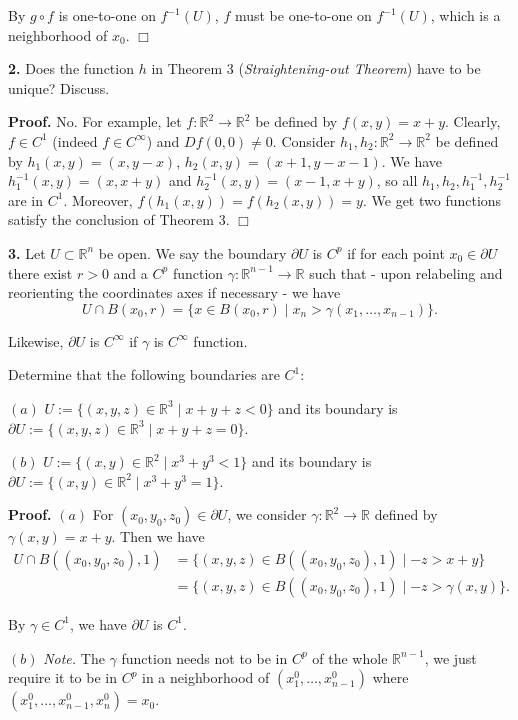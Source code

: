\documentclass{article}
\begin{document}
By $g\circ f$ is one-to-one on $f^{-1}(U)$, $f$ must be one-to-one on
$f^{-1}(U)$, which is a neighborhood of $x_0$. $\Box$

    \textbf{2.} Does the function $h$ in Theorem 3 (\emph{Straightening-out
Theorem}) have to be unique? Discuss.

    \textbf{Proof.} No. For example, let $f:\mathbb{R}^2 \to \mathbb{R}^2$
be defined by $f(x,y) = x+y$. Clearly, $f \in C^1$ (indeed
$f\in C^{\infty}$) and $Df(0,0) \ne 0$. Consider
$h_1,h_2 :\mathbb{R}^2 \to \mathbb{R}^2$ be defined by
$h_1(x,y) = (x,y -x)$, $h_2(x,y) = (x+1,y-x-1)$. We have
$h_1^{-1}(x,y) = (x,x+y)$ and $h_2^{-1}(x,y) = (x-1, x + y )$, so all
$h_1, h_2, h_1^{-1}, h_2^{-1}$ are in $C^{1}$. Moreover,
$f(h_1(x,y)) = f(h_2(x,y)) = y$. We get two functions satisfy the
conclusion of Theorem 3. $\Box$

    \textbf{3.} Let $U \subset \mathbb{R}^n$ be open. We say the boundary
$\partial U$ is $C^p$ if for each point $x_0 \in \partial U$ there exist
$r > 0$ and a $C^p$ function $\gamma : \mathbb{R}^{n-1} \to \mathbb{R}$
such that - upon relabeling and reorienting the coordinates axes if
necessary - we have
\[U \cap B(x_0 , r) = \{x \in B(x_0 , r) \mid x_n > \gamma(x_1 , \ldots , x_{n−1})\}.\]

Likewise, $\partial U$ is $C^{\infty}$ if $\gamma$ is $C^{\infty}$
function.

Determine that the following boundaries are $C^1$:

$(a)$ $U := \{(x, y, z) \in \mathbb{R}^3 \mid x + y + z < 0\}$ and its
boundary is
$\partial U := \{(x, y, z) \in \mathbb{R}^3 \mid x + y + z = 0\}$.

$(b)$ $U := \{(x, y) \in \mathbb{R}^2 \mid  x^3 + y^3 < 1\}$ and its
boundary is
$\partial U := \{(x, y) \in \mathbb{R}^2 \mid  x^3 + y^3 = 1\}$.

    \textbf{Proof.} $(a)$ For $(x_0,y_0,z_0) \in \partial U$, we consider
$\gamma :\mathbb{R}^2 \to \mathbb{R}$ defined by $\gamma(x,y) = x+y$.
Then we have \[\begin{aligned}
U \cap B((x_0,y_0,z_0),1) &= \{ (x,y,z) \in B((x_0,y_0,z_0),1) \mid -z > x  + y\}\\
&= \{ (x,y,z) \in B((x_0,y_0,z_0),1) \mid -z > \gamma(x,y) \}.
\end{aligned}\]

By $\gamma \in C^1$, we have $\partial U$ is $C^1$.

$(b)$ \emph{Note.} The $\gamma$ function needs not to be in $C^p$ of the
whole $\mathbb{R}^{n-1}$, we just require it to be in $C^p$ in a
neighborhood of $(x^0_1,\ldots,x^0_{n-1})$ where
$(x^0_1,\ldots,x^0_{n-1},x^0_n)=x_0 $.
\end{document}
